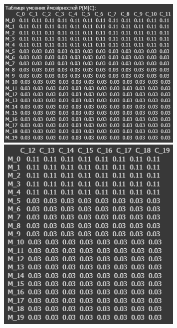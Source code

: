 \begin{figure}[!ht]
        \centering
        \begin{minipage}{0.55\linewidth}
            \includegraphics[width=0.8\textwidth, scale=0.6]{ReportPic/report_3.1.png}
        \end{minipage}
        \begin{minipage}{0.4\linewidth}
            \includegraphics[width=0.8\textwidth, scale=0.5]{ReportPic/report_3.2.png}
        \end{minipage}
\end{figure}
